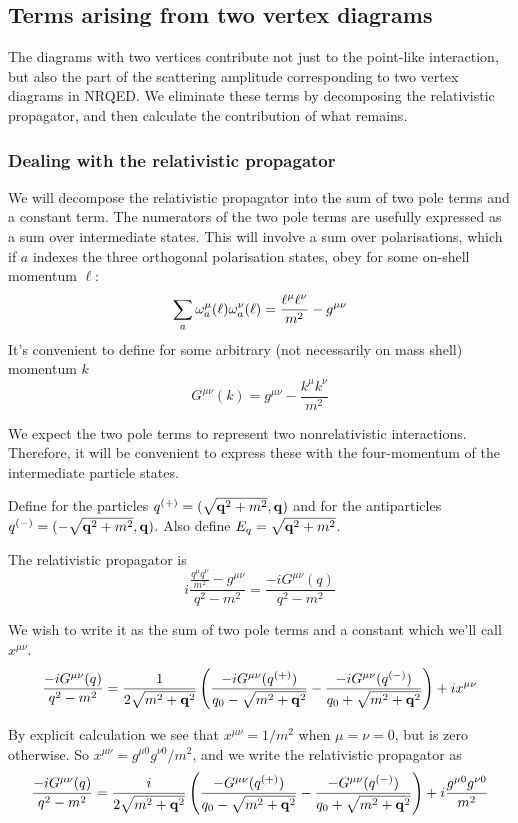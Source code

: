 \subsection{Terms arising from two vertex diagrams}

The diagrams with two vertices contribute not just to the point-like interaction, but also the part of the scattering amplitude corresponding to two vertex diagrams in NRQED.  We eliminate these terms by decomposing the relativistic propagator, and then calculate the contribution of what remains.

\subsubsection{Dealing with the relativistic propagator}

We will decompose the relativistic propagator into the sum of two pole terms and a constant term.  The numerators of the two pole terms are usefully expressed as a sum over intermediate states.  This will involve a sum over polarisations, which if $a$ indexes the three orthogonal polarisation states, obey for some on-shell momentum $\ell$:
\[
	\sum_a \omega_a^\mu(\ell) \omega_a^\nu(\ell) = \frac{\ell^\mu \ell^\nu}{m^2} - g^{\mu\nu} 
\]
It's convenient to define for some arbitrary (not necessarily on mass shell) momentum $k$
\[
  G^{\mu\nu}(k) = g^{\mu\nu} - \frac{k^\mu k^\nu}{m^2}
\]

We expect the two pole terms to represent two nonrelativistic interactions.  Therefore, it will be convenient to express these with the four-momentum of the intermediate particle states.   

Define for the particles $q^{(+)}{} = (\sqrt{\mathbf{q}^2+m^2}, \mathbf{q})$ and for the antiparticles $q^{(-)}{} = (-\sqrt{\mathbf{q}^2+m^2}, \mathbf{q})$.  Also define $E_q = \sqrt{\mathbf{q}^2+m^2}$.

The relativistic propagator is
\[
	i\frac{  \frac{q^\mu q^\nu}{m^2} - g^{\mu\nu} }{q^2 - m^2} = \frac{ - i G^{\mu\nu}(q) }{q^2 - m^2}
\]

We wish to write it as the sum of two pole terms and a constant which we'll call $x^{\mu\nu}$.
\[
	\frac{ -i G^{\mu\nu}(q) }{q^2 - m^2} = \frac{1}{2 \sqrt{ m^2 + \mathbf{q}^2 }} \left(  \frac{ -i G^{\mu\nu}(q^{(+)}{})  }{q_0 - \sqrt{ m^2 + \mathbf{q}^2 } } - \frac{ -i G^{\mu\nu}(q^{(-)}{})  }{q_0 + \sqrt{ m^2 + \mathbf{q}^2 } } \right) + i x^{\mu\nu}
\]

By explicit calculation we see that $x^{\mu\nu}=1/m^2$ when $\mu=\nu=0$, but is zero otherwise.  So $x^{\mu\nu} = g^{\mu0} g^{\nu0} /m^2$, and we write the relativistic propagator as
\[
	\frac{ -i G^{\mu\nu}(q) }{q^2 - m^2} = \frac{i}{2 \sqrt{ m^2 + \mathbf{q}^2 }} \left(  \frac{ -G^{\mu\nu}(q^{(+)}{})  }{q_0 - \sqrt{ m^2 + \mathbf{q}^2 } } - \frac{ -G^{\mu\nu}(q^{(-)}{})  }{q_0 + \sqrt{ m^2 + \mathbf{q}^2 } } \right) + i\frac{g^{\mu0} g^{\nu0}}{m^2}
\]

